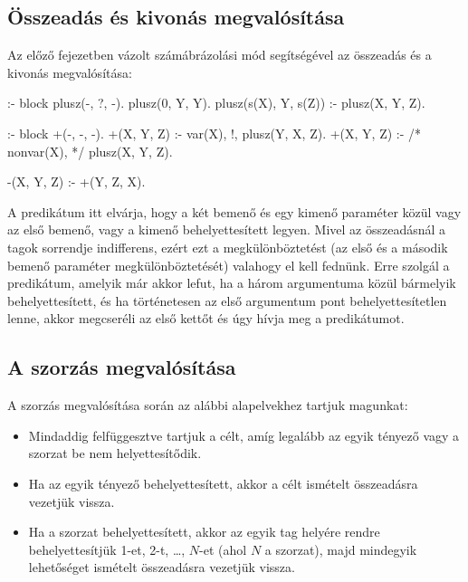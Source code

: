 \subsection{Összeadás és kivonás megvalósítása}

Az előző fejezetben vázolt számábrázolási mód segítségével az összeadás
és a kivonás megvalósítása:

\begin{prologcode}
:- block plusz(-, ?, -).
plusz(0, Y, Y).
plusz(s(X), Y, s(Z)) :-
      plusz(X, Y, Z).

:- block +(-, -, -).
+(X, Y, Z) :- 
      var(X), !, plusz(Y, X, Z).  %
+(X, Y, Z) :-
      /* nonvar(X), */ plusz(X, Y, Z).

-(X, Y, Z) :-
      +(Y, Z, X).
\end{prologcode}

A  predikátum itt elvárja, hogy a két bemenő és egy kimenő
paraméter közül vagy az első bemenő, vagy a kimenő behelyettesített legyen.
Mivel az összeadásnál a tagok sorrendje indifferens, ezért ezt a
megkülönböztetést (az első és a második bemenő paraméter megkülönböztetését)
valahogy el kell fednünk. Erre szolgál a  predikátum, amelyik
már akkor lefut, ha a három argumentuma közül bármelyik behelyettesített,
és ha történetesen az első argumentum pont behelyettesítetlen lenne, akkor
megcseréli az első kettőt és úgy hívja meg a  predikátumot.

\subsection{A szorzás megvalósítása}

A szorzás megvalósítása során az alábbi alapelvekhez tartjuk magunkat:

\begin{itemize}
\item Mindaddig felfüggesztve tartjuk a célt, amíg legalább az egyik tényező
vagy a szorzat be nem helyettesítődik.
\item Ha az egyik tényező behelyettesített, akkor a célt ismételt összeadásra
vezetjük vissza.
\item Ha a szorzat behelyettesített, akkor az egyik tag helyére rendre
behelyettesítjük 1-et, 2-t, \ldots, $N$-et (ahol $N$ a szorzat), majd mindegyik
lehetőséget ismételt összeadásra vezetjük vissza.
\end{itemize}

